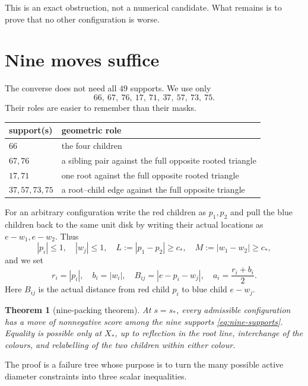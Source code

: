 \documentclass[11pt]{article}
\theoremstyle{plain}
\newtheorem{theorem}{Theorem}[section]
\theoremstyle{definition}
\theoremstyle{remark}
\newcommand{\sstar}{s_{\!*}}
\newcommand{\cstar}{c_{\!*}}
\begin{document}
This is an exact obstruction, not a numerical candidate.  What remains is
to prove that no other configuration is worse.

\section{Nine moves suffice}\label{sec:nine}

The converse does not need all $49$ supports.  We use only
\begin{equation}\label{eq:nine-supports}
 \boxed{66,\ 67,\ 76,\ 17,\ 71,\ 37,\ 57,\ 73,\ 75.}
\end{equation}
Their roles are easier to remember than their masks.

\begin{center}
\begin{tabularx}{0.92\textwidth}{@{}lY@{}}
\toprule
support(s)&geometric role\\
\midrule
$66$&the four children\\
$67,76$&a sibling pair against the full opposite rooted triangle\\
$17,71$&one root against the full opposite rooted triangle\\
$37,57,73,75$&a root--child edge against the full opposite triangle\\
\bottomrule
\end{tabularx}
\end{center}

For an arbitrary configuration write the red children as $p_1,p_2$ and pull
the blue children back to the same unit disk by writing their actual
locations as $e-w_1,e-w_2$.  Thus
\[
 |p_i|\le1,\quad|w_j|\le1,\quad
 L:=|p_1-p_2|\ge\cstar,\quad M:=|w_1-w_2|\ge\cstar,
\]
and we set
\[
 r_i=|p_i|,\quad b_i=|w_i|,\quad B_{ij}=|e-p_i-w_j|,\quad
 a_i=\frac{r_i+b_i}{2}.
\]
Here $B_{ij}$ is the actual distance from red child $p_i$ to blue child
$e-w_j$.

\begin{theorem}[nine-packing theorem]\label{thm:nine}
At $s=\sstar$, every admissible configuration has a move of nonnegative
score among the nine supports \eqref{eq:nine-supports}.  Equality is
possible only at $X_*$, up to reflection in the root line, interchange of
the colours, and relabelling of the two children within either colour.
\end{theorem}

The proof is a failure tree whose purpose is to turn the many possible
active diameter constraints into three scalar inequalities.
\end{document}
